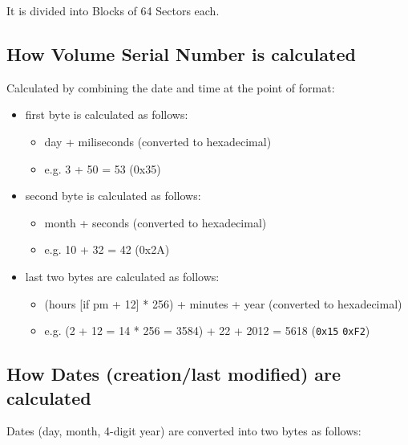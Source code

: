 \documentclass[a4paper,11pt]{article}
\begin{document}
        It is divided into Blocks of 64 Sectors each.

    \subsection{How Volume Serial Number is calculated}
    Calculated by combining the date and time at the point of format:

    \begin{itemize}
        \item first byte is calculated as follows:
        \begin{itemize}
            \item day + miliseconds (converted to hexadecimal)
            \item e.g. 3 + 50 = 53 (0x35)
        \end{itemize}
        \item second byte is calculated as follows:
        \begin{itemize}
            \item month + seconds (converted to hexadecimal)
            \item e.g. 10 + 32 = 42 (0x2A)
        \end{itemize}
        \item last two bytes are calculated as follows:
        \begin{itemize}
            \item (hours [if pm + 12] * 256) + minutes + year (converted to
            hexadecimal)
            \item e.g. (2 + 12 = 14 * 256 = 3584) + 22 + 2012 = 5618
            (\texttt{0x15} \texttt{0xF2})
        \end{itemize}
    \end{itemize}

    \subsection{How Dates (creation/last modified) are calculated}
    
    Dates (day, month, 4-digit year) are converted into two bytes as follows:
\end{document}
